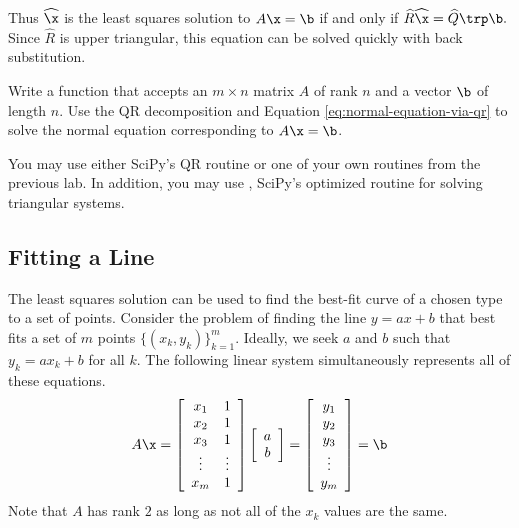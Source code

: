 Thus $\widehat{\x}$ is the least squares solution to $A\x=\b$ if and only if $\widehat{R}\widehat{\x} = \widehat{Q}\trp\b.$
Since $\widehat{R}$ is upper triangular, this equation can be solved quickly with back substitution.

\begin{problem} %
Write a function that accepts an $m \times n$ matrix $A$ of rank $n$ and a vector $\b$ of length $n$.
Use the QR decomposition and Equation \ref{eq:normal-equation-via-qr} to solve the normal equation corresponding to $A\x = \b$.

You may use either SciPy's QR routine or one of your own routines from the previous lab.
In addition, you may use , SciPy's optimized routine for solving triangular systems.

\label{prob:lstsq-via-qr}
\end{problem}

\subsection*{Fitting a Line} %

The least squares solution can be used to find the best-fit curve of a chosen type to a set of points.
Consider the problem of finding the line $y = ax + b$ that best fits a set of $m$ points $\{(x_k, y_k)\}_{k=1}^m$.
Ideally, we seek $a$ and $b$ such that $y_k = ax_k + b$ for all $k$.
The following linear system simultaneously represents all of these equations.
%
\begin{equation}
A\x =
\left[\begin{array}{cc}
x_1 & 1 \\
x_2 & 1 \\
x_3 & 1 \\
\vdots & \vdots \\
x_m & 1
\end{array}\right]
\left[\begin{array}{c} a \\ b \end{array}\right]
=
\left[\begin{array}{c} y_1 \\ y_2 \\ y_3 \\ \vdots \\ y_m \end{array}\right]
= \b
\label{eq:linear-least-squares}
\end{equation}
%
Note that $A$ has rank $2$ as long as not all of the $x_k$ values are the same.

